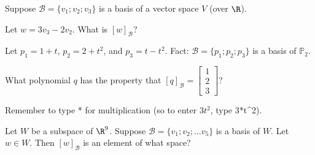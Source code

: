 Suppose $\mathcal{B} = \{v_1; v_2; v_3\}$ is a basis of a vector space $V$ (over $\R$).  

Let $w = 3v_3 - 2v_2$.  What is $[w]_{\mathcal{B}}$?  







\endedxproblem




Let $p_1 = 1+t$, $p_2 = 2+t^2$, and $p_3 = t-t^2$.  Fact: $\mathcal{B} = \{p_1; p_2; p_3\}$ is a basis of  $\mathbb{P}_2$.  

What polynomial $q$ has the property that  $[q]_{\mathcal{B}} = \left[\begin{array}{c} 1 \\ 2  \\ 3 \end{array} \right]$?

Remember to type * for multiplication (so to enter $3t^2$, type 3*t^2).  



\endedxproblem


\endedxvertical








Let $W$ be a subspace of $\R^9$.  
Suppose $\mathcal{B} = \{v_1; v_2; \ldots v_5\}$ is a basis of $W$.  Let $w \in W$.  Then  $[w]_{\mathcal{B}}$ is an element of what space?  


